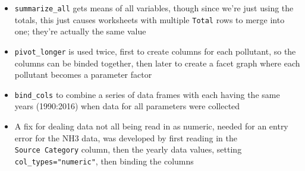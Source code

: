 \documentclass[
]{book}
\providecommand{\tightlist}{%
  \setlength{\itemsep}{0pt}\setlength{\parskip}{0pt}}
\begin{document}
\begin{itemize}
\tightlist
\item
  \texttt{summarize\_all} gets means of all variables, though since we're just using the totals, this just causes worksheets with multiple \texttt{Total} rows to merge into one; they're actually the same value
\item
  \texttt{pivot\_longer} is used twice, first to create columns for each pollutant, so the columns can be binded together, then later to create a facet graph where each pollutant becomes a parameter factor
\item
  \texttt{bind\_cols} to combine a series of data frames with each having the same years (1990:2016) when data for all parameters were collected
\item
  A fix for dealing data not all being read in as numeric, needed for an entry error for the NH3 data, was developed by first reading in the \texttt{Source\ Category} column, then the yearly data values, setting \texttt{col\_types="numeric"}, then binding the columns
\end{itemize}
\end{document}
